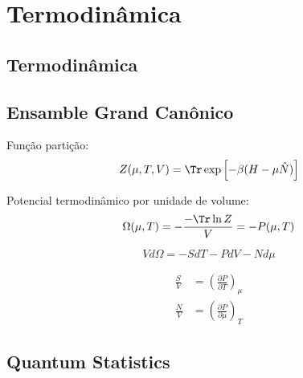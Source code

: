 \chapter{Termodinâmica}

%

\section{Termodinâmica}

\section{Ensamble Grand Canônico}

Função partição:
\begin{equation}
	Z(\mu, T, V) = \Tr \exp\left[-\beta(H-\mu\hat{N})\right]
\end{equation}

Potencial termodinâmico por unidade de volume:
\begin{equation}
	\Omega(\mu, T) = -\frac{-\Tr\ln Z}{V} = -P(\mu,T)
\end{equation}

\begin{equation}
	Vd\Omega = -S dT - PdV - Nd\mu
\end{equation}

\begin{align}
	\frac{S}{V} &= \left(\frac{\partial P}{\partial T}\right)_\mu \\
	\frac{N}{V} &= \left(\frac{\partial P}{\partial\mu}\right)_T
\end{align}

\section{Quantum Statistics}
